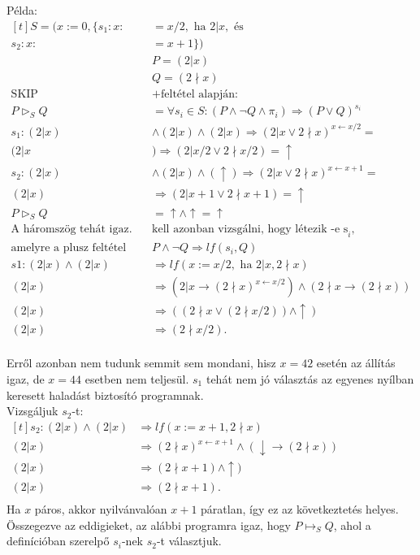 \documentclass[12pt]{article}
\newcommand{\egyenesnyil}[2]{$#1 \mapsto_S #2$}
\begin{document}
Példa:
$
\begin{aligned}[t]
S = (x:=0, \{s_1: x :&= x/2, \text{ ha } 2|x, \text{ és}\\
s_2: x :&= x+1\})\\
&P = (2|x)\\
&Q = (2\nmid x)\\
\text{SKIP} &+ \text{feltétel alapján: }\\
P \vartriangleright_S Q &=\forall s_i \in S: (P \land \neg Q \land \pi_i) \Rightarrow (P \lor Q)^{s_i}\\
s_1: (2|x) &\land (2|x) \land (2|x) \Rightarrow (2|x \lor 2\nmid x)^{x \leftarrow x/2} = \\
(2|x &) \Rightarrow (2|x/2 \lor 2\nmid x/2) = \uparrow \\
s_2: (2|x) &\land (2|x) \land (\uparrow) \Rightarrow (2|x \lor 2\nmid x)^{x \leftarrow x+1} = \\
(2|x) &\Rightarrow (2|x+1 \lor 2\nmid x+1) = \uparrow\\
P \vartriangleright_S Q &= \uparrow \land \uparrow = \uparrow\\
\text{A háromszög tehát igaz. Meg } & \text{kell azonban vizsgálni, hogy létezik -e s}_i,\\
\text{amelyre a plusz feltétel teljesül: }& P\land \neg Q \Rightarrow lf(s_i, Q)\\
s1: (2|x) \land (2|x) &\Rightarrow lf(x:=x/2, \text{ ha } 2|x, 2\nmid x)\\
(2|x) &\Rightarrow (2|x \rightarrow (2\nmid x)^{x\leftarrow x/2}) \land (2\nmid x \rightarrow (2\nmid x))\\
(2|x) &\Rightarrow ((2\nmid x \lor (2\nmid x/2)) \land \uparrow)\\
(2|x) &\Rightarrow (2 \nmid x/2).\\
\end{aligned}
$

Erről azonban nem tudunk semmit sem mondani, hisz $x=42$ esetén az állítás igaz, de $x=44$ esetben nem teljesül. $s_1$ tehát nem jó választás az egyenes nyílban keresett haladást biztosító programnak.\\
Vizsgáljuk $s_2$-t:\\
$
\begin{aligned}[t]
s_2: (2|x) \land (2|x) &\Rightarrow lf(x:=x+1, 2\nmid x)\\
(2|x) &\Rightarrow (2\nmid x)^{x\leftarrow x+1} \land (\downarrow \rightarrow (2\nmid x))\\
(2|x) &\Rightarrow (2\nmid x+1) \land \uparrow)\\
(2|x) &\Rightarrow (2 \nmid x+1).\\
\end{aligned}
$
\\
Ha $x$ páros, akkor nyilvánvalóan $x+1$ páratlan, így ez az következtetés helyes. Összegezve az eddigieket, az alábbi programra igaz, hogy \egyenesnyil{P}{Q}, ahol a definícióban szerelpő $s_i$-nek $s_2$-t választjuk.
\newpage
\end{document}
